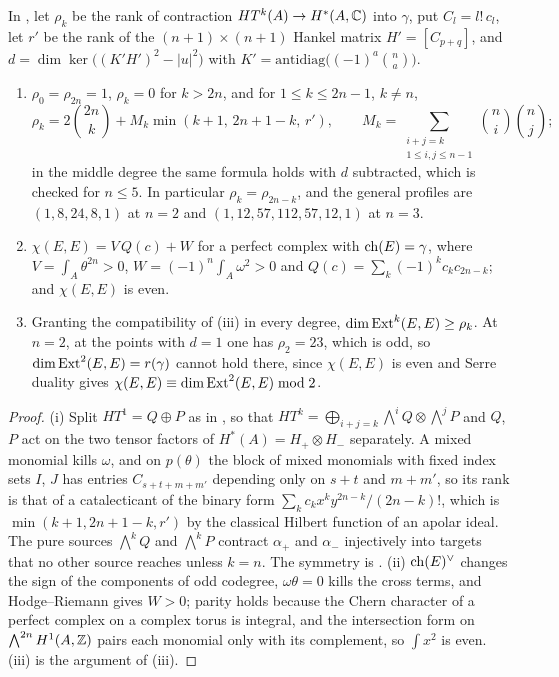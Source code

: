 \begin{proposition}
\label{prop:p2primeprofile}
In , let $\rho_{k}$ be the rank of contraction
$HT^{k}(A)\to H^{*}(A,\mathbb{C})$ into $\gamma$, put $C_{l}=l!\,c_{l}$, let
$r'$ be the rank of the $(n+1)\times(n+1)$ Hankel matrix $H'=[C_{p+q}]$, and
$d=\dim\ker\bigl((K'H')^{2}-|u|^{2}\bigr)$ with
$K'=\mathrm{antidiag}\bigl((-1)^{a}\binom{n}{a}\bigr)$.
\begin{enumerate}[label=\textup{(\roman*)},leftmargin=2.6em,itemsep=2pt]
\item $\rho_{0}=\rho_{2n}=1$, $\rho_{k}=0$ for $k>2n$, and for
  $1\le k\le2n-1$, $k\ne n$,
  \[
    \rho_{k}=2\binom{2n}{k}+M_{k}\min(k+1,\,2n+1-k,\,r'),\qquad
    M_{k}=\sum_{\substack{i+j=k\\1\le i,j\le n-1}}\binom{n}{i}\binom{n}{j};
  \]
  in the middle degree the same formula holds with $d$ subtracted, which is
  checked for $n\le5$. In particular $\rho_{k}=\rho_{2n-k}$, and the general
  profiles are $(1,8,24,8,1)$ at $n=2$ and $(1,12,57,112,57,12,1)$ at
  $n=3$.
\item $\chi(E,E)=V\,Q(c)+W$ for a perfect complex with $\operatorname{ch}(E)=\gamma$, where
  $V=\int_{A}\theta^{2n}>0$, $W=(-1)^{n}\int_{A}\omega^{2}>0$ and
  $Q(c)=\sum_{k}(-1)^{k}c_{k}c_{2n-k}$; and $\chi(E,E)$ is even.
\item Granting the compatibility of (iii) in every degree,
  $\dim\operatorname{Ext}^{k}(E,E)\ge\rho_{k}$. At $n=2$, at the points with $d=1$ one has
  $\rho_{2}=23$, which is odd, so $\dim\operatorname{Ext}^{2}(E,E)=r(\gamma)$ cannot hold
  there, since $\chi(E,E)$ is even and Serre duality gives
  $\chi(E,E)\equiv\dim\operatorname{Ext}^{2}(E,E)\bmod2$.
\end{enumerate}
\end{proposition}

\begin{proof}
(i) Split $HT^{1}=Q\oplus P$ as in , so that
$HT^{k}=\bigoplus_{i+j=k}\bigwedge^{i}Q\otimes\bigwedge^{j}P$ and $Q$, $P$ act
on the two tensor factors of $H^{*}(A)=H_{+}\otimes H_{-}$ separately. A mixed
monomial kills $\omega$, and on $p(\theta)$ the block of mixed monomials with
fixed index sets $I$, $J$ has entries $C_{s+t+m+m'}$ depending only on
$s+t$ and $m+m'$, so its rank is that of a catalecticant of the binary form
$\sum_{k}c_{k}x^{k}y^{2n-k}/(2n-k)!$, which is $\min(k+1,2n+1-k,r')$ by the
classical Hilbert function of an apolar ideal. The pure sources
$\bigwedge^{k}Q$ and $\bigwedge^{k}P$ contract $\alpha_{+}$ and $\alpha_{-}$
injectively into targets that no other source reaches unless $k=n$. The
symmetry is . (ii) $\operatorname{ch}(E)^{\vee}$ changes the sign of
the components of odd codegree, $\omega\theta=0$ kills the cross terms, and
Hodge--Riemann gives $W>0$; parity holds because the Chern character of a
perfect complex on a complex torus is integral, and the intersection form on
$\bigwedge^{2n}H^{1}(A,\mathbb{Z})$ pairs each monomial only with its complement, so
$\int x^{2}$ is even. (iii) is the argument of (iii).
\end{proof}

